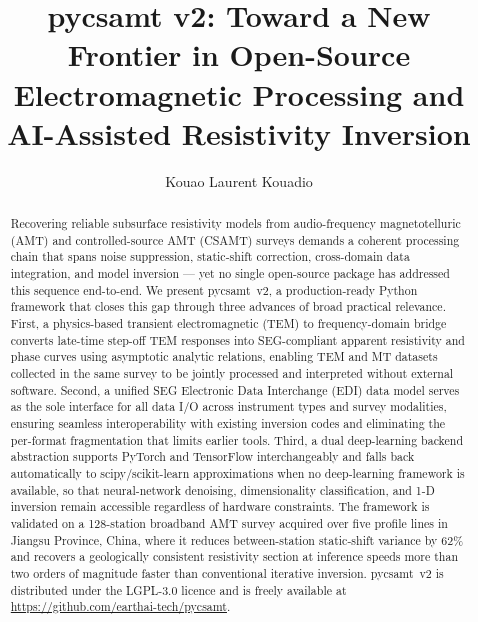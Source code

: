 \documentclass[review,12pt]{elsarticle}
\begin{document}
\begin{frontmatter}

\title{pycsamt v2: Toward a New Frontier in Open-Source Electromagnetic
       Processing and AI-Assisted Resistivity Inversion}

\author[csu,ufhb]{Kouao Laurent Kouadio%
  }

\address[csu]{Department of Geophysics, School of Geosciences and
  Info-physics, Central South University, Changsha 410083, China}

\address[ufhb]{Laboratoire de Géologie, Ressources Minérales et
  Énergétiques, UFR des Sciences de la Terre et des Ressources Minières,
  Université Félix Houphouët-Boigny, 22~BP~582 Abidjan 22, Côte d'Ivoire}

\begin{abstract}
Recovering reliable subsurface resistivity models from audio-frequency
magnetotelluric (AMT) and controlled-source AMT (CSAMT) surveys demands a
coherent processing chain that spans noise suppression, static-shift
correction, cross-domain data integration, and model inversion — yet no
single open-source package has addressed this sequence end-to-end.
We present pycsamt~v2, a production-ready Python framework that closes
this gap through three advances of broad practical relevance.
First, a physics-based transient electromagnetic (TEM) to frequency-domain
bridge converts late-time step-off TEM responses into SEG-compliant apparent
resistivity and phase curves using asymptotic analytic relations, enabling
TEM and MT datasets collected in the same survey to be jointly processed and
interpreted without external software.
Second, a unified SEG Electronic Data Interchange (EDI) data model serves
as the sole interface for all data I/O across instrument types and survey
modalities, ensuring seamless interoperability with existing inversion codes
and eliminating the per-format fragmentation that limits earlier tools.
Third, a dual deep-learning backend abstraction supports PyTorch and
TensorFlow interchangeably and falls back automatically to
scipy/scikit-learn approximations when no deep-learning framework is
available, so that neural-network denoising, dimensionality classification,
and 1-D inversion remain accessible regardless of hardware constraints.
The framework is validated on a 128-station broadband AMT survey acquired
over five profile lines in Jiangsu Province, China, where it reduces
between-station static-shift variance by 62\% and recovers a geologically
consistent resistivity section at inference speeds more than two orders
of magnitude faster than conventional iterative inversion.
pycsamt~v2 is distributed under the LGPL-3.0 licence and is freely
available at \url{https://github.com/earthai-tech/pycsamt}.
\end{abstract}


\end{frontmatter}
\end{document}
